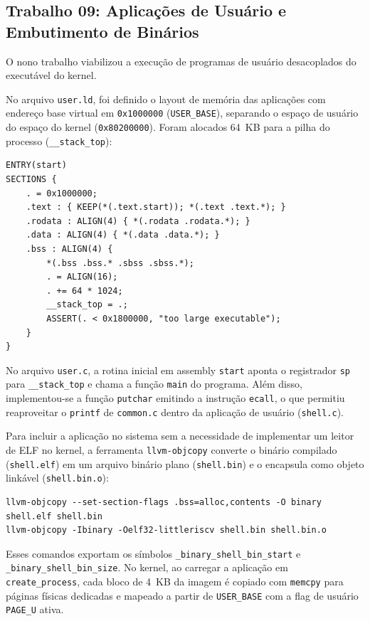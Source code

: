 \documentclass[12pt]{article}
\begin{document}
\subsection{Trabalho 09: Aplicações de Usuário e Embutimento de Binários}

O nono trabalho viabilizou a execução de programas de usuário desacoplados do executável do kernel.

No arquivo \texttt{user.ld}, foi definido o layout de memória das aplicações com endereço base virtual em \texttt{0x1000000} (\texttt{USER\_BASE}), separando o espaço de usuário do espaço do kernel (\texttt{0x80200000}). Foram alocados 64~KB para a pilha do processo (\texttt{\_\_stack\_top}):

\begin{verbatim}
ENTRY(start)
SECTIONS {
    . = 0x1000000;
    .text : { KEEP(*(.text.start)); *(.text .text.*); }
    .rodata : ALIGN(4) { *(.rodata .rodata.*); }
    .data : ALIGN(4) { *(.data .data.*); }
    .bss : ALIGN(4) {
        *(.bss .bss.* .sbss .sbss.*);
        . = ALIGN(16);
        . += 64 * 1024;
        __stack_top = .;
        ASSERT(. < 0x1800000, "too large executable");
    }
}
\end{verbatim}

No arquivo \texttt{user.c}, a rotina inicial em assembly \texttt{start} aponta o registrador \texttt{sp} para \texttt{\_\_stack\_top} e chama a função \texttt{main} do programa. Além disso, implementou-se a função \texttt{putchar} emitindo a instrução \texttt{ecall}, o que permitiu reaproveitar o \texttt{printf} de \texttt{common.c} dentro da aplicação de usuário (\texttt{shell.c}).

Para incluir a aplicação no sistema sem a necessidade de implementar um leitor de ELF no kernel, a ferramenta \texttt{llvm-objcopy} converte o binário compilado (\texttt{shell.elf}) em um arquivo binário plano (\texttt{shell.bin}) e o encapsula como objeto linkável (\texttt{shell.bin.o}):

\begin{verbatim}
llvm-objcopy --set-section-flags .bss=alloc,contents -O binary shell.elf shell.bin
llvm-objcopy -Ibinary -Oelf32-littleriscv shell.bin shell.bin.o
\end{verbatim}

Esses comandos exportam os símbolos \texttt{\_binary\_shell\_bin\_start} e \texttt{\_binary\_shell\_bin\_size}. No kernel, ao carregar a aplicação em \texttt{create\_process}, cada bloco de 4~KB da imagem é copiado com \texttt{memcpy} para páginas físicas dedicadas e mapeado a partir de \texttt{USER\_BASE} com a flag de usuário \texttt{PAGE\_U} ativa.
\end{document}
